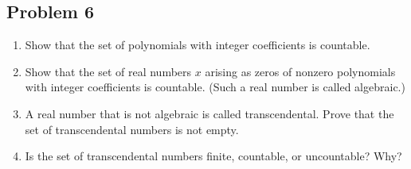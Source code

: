 \documentclass{article}
\begin{document}
\clearpage

\subsection*{Problem 6}
{\it \begin{enumerate}
	\item Show that the set of polynomials with integer coefficients is countable.
	\item Show that the set of real numbers $x$ arising
	as zeros of nonzero polynomials with integer coefficients is countable.
	(Such a real number is called algebraic.)
	\item A real number that is not algebraic is called transcendental.
	Prove that the set of transcendental numbers is not empty.
	\item Is the set of transcendental numbers finite, countable, or uncountable? Why?
\end{enumerate}
}
\end{document}
